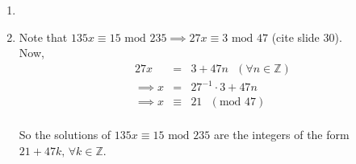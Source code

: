 \begin{enumerate}

\item

\item Note that $135x \equiv 15 \textrm{ mod } 235 \implies 27x \equiv 3 \textrm{ mod } 47$ (cite slide 30). \\
  Now, \begin{eqnarray*}
    27x &=& 3 + 47n \textrm{ } (\forall n \in \mathbb{Z}) \\
    \implies x &=& 27^{-1} \cdot 3 + 47n \\
    \implies x &\equiv& 21 \textrm{ } (\textrm{mod } 47) \\
  \end{eqnarray*}

So the solutions of $135x \equiv 15 \textrm{ mod } 235$ are the integers of the form $21 + 47k \textrm{, } \forall k \in \mathbb{Z}$.

\end{enumerate}
